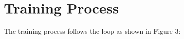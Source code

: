 \documentclass[
12pt, %
oneside, %
english, %
onehalfspacing, %
nolistspacing, %
liststotoc, %
headsepline, %
]{ProposalAndThesis} %
\begin{document}







\mainmatter %










\chapter{Training Process}
The training process follows the loop as shown in Figure 3:
\end{document}
